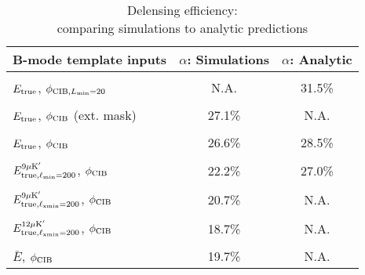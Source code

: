 \begin{table}
\caption{Delensing efficiency: \\ comparing simulations to analytic predictions}
\centering
\begin{tabular}{|l | c | c |}
\hline\hline
B-mode template inputs & $\alpha$: Simulations  & $\alpha$: Analytic \\
\hline
\vspace{-0.28cm}&  & \\

$E_{\rm true}$, $\phi_{{\rm CIB}, L_{\rm min} = 20}$		         		& N.A.      & 31.5\%    \\
\vspace{-0.28cm}&  & \\
$E_{\rm true}$, $\phi_{\rm CIB}$ (ext. mask)				      		 & 27.1\% & N.A.      \\
\vspace{-0.28cm}&  & \\
$E_{\rm true}$, $\phi_{\rm CIB}$ 		     						& 26.6\% & 28.5\%    \\
\vspace{-0.28cm}&  & \\
$E^{9\mu {\rm K}^{\prime}}_{\rm true, \ell_{min} = 200}$, $\phi_{\rm CIB}$       & 22.2\% & 27.0\%  \\
\vspace{-0.28cm}&  & \\
$E^{9\mu {\rm K}^{\prime}}_{\rm true, \ell_{x min} = 200}$, $\phi_{\rm CIB}$    & 20.7\% & N.A.     \\
\vspace{-0.28cm}&  & \\
$E^{12\mu {\rm K}^{\prime}}_{\rm true, \ell_{x min} = 200}$, $\phi_{\rm CIB}$  & 18.7\%  & N.A.      \\
\vspace{-0.28cm}&  & \\
$\bar{E}$, $\phi_{\rm CIB}$  						     			 & 19.7\%   & N.A.      \\
\hline
\end{tabular}
\vspace{0.1cm}
\end{table}
